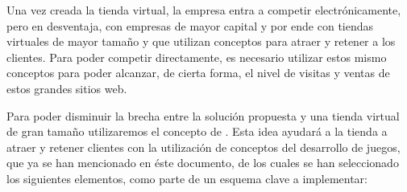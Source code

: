 Una vez creada la tienda virtual, la empresa entra a competir electrónicamente,
pero en desventaja, con empresas de mayor capital y por ende con tiendas virtuales
de mayor tamaño y que utilizan conceptos para atraer y retener a los clientes.
Para poder competir directamente, es necesario utilizar estos mismo conceptos para
poder alcanzar, de cierta forma, el nivel de visitas y ventas de estos grandes
sitios web.

Para poder disminuir la brecha entre la solución propuesta y una tienda virtual
de gran tamaño utilizaremos el concepto de {\GAM}.
Esta idea ayudará a la tienda a atraer y retener clientes con la utilización
de conceptos del desarrollo de juegos, que ya se han mencionado en éste documento,
de los cuales se han seleccionado los siguientes elementos, como parte
de un esquema clave a implementar:

